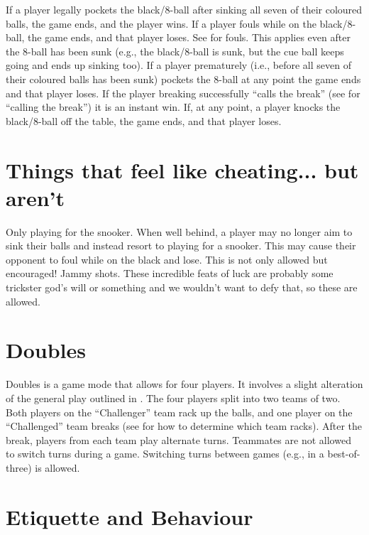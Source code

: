  If a player legally pockets the black/8-ball after sinking all seven of their coloured balls, the game ends, and the player wins.%
 If a player fouls while on the black/8-ball, the game ends, and that player loses. See  for fouls. This applies even after the 8-ball has been sunk (e.g., the black/8-ball is sunk, but the cue ball keeps going and ends up sinking too).%
 If a player prematurely (i.e., before all seven of their coloured balls has been sunk) pockets the 8-ball at any point the game ends and that player loses.%
 If the player breaking successfully “calls the break” (see  for “calling the break”) it is an instant win.%
 If, at any point, a player knocks the black/8-ball off the table, the game ends, and that player loses.%
 \IntentionalFoulLoss[8ball]%
 \MisleadingOpponentLoss[8ball]%
 \PoorBehaviorLoss[8ball]%

\section{Things that feel like cheating... but aren't} \label{8ball:notcheating}

 Only playing for the snooker. When well behind, a player may no longer aim to sink their balls and instead resort to playing for a snooker. This may cause their opponent to foul while on the black and lose. This is not only allowed but encouraged!%
 Jammy shots. These incredible feats of luck are probably some trickster god's will or something and we wouldn't want to defy that, so these are allowed.%

\section{Doubles} \label{8ball:doubles}

 Doubles is a game mode that allows for four players. It involves a slight alteration of the general play outlined in .%
 The four players split into two teams of two.%
 Both players on the “Challenger” team rack up the balls, and one player on the “Challenged” team breaks (see  for how to determine which team racks).%
 After the break, players from each team play alternate turns.%
 Teammates are not allowed to switch turns during a game. Switching turns between games (e.g., in a best-of-three) is allowed.%

\section{Etiquette and Behaviour} \label{8ball:etiquette}

\Misleading%
 \DistractingWhileSettingUp%
 \DistractingWhileStriking%
\Sportsmanship%
